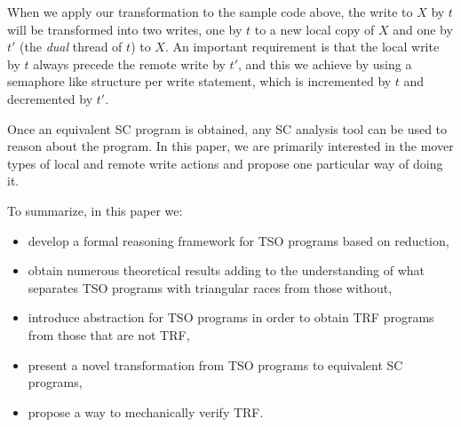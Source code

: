 \documentclass[preprint,9pt]{sigplanconf}
\begin{document}
When we apply our transformation to the sample code above, the write to $X$ by $t$ will be transformed into two writes, one by $t$ to a new local copy of $X$ and one by $t'$ (the {\em dual} thread of $t$) to $X$.
An important requirement is that the local write by $t$ always precede the remote write by $t'$, and this we achieve by using a semaphore like structure per write statement, which is incremented by $t$ and decremented by $t'$. 

Once an equivalent SC program is obtained, any SC analysis tool can be used to reason about the program.
In this paper, we are primarily interested in the mover types of local and remote write actions and propose one particular way of doing it.

To summarize, in this paper we:
\begin{itemize}
\item develop a formal reasoning framework for TSO programs based on reduction,
\item obtain numerous theoretical results adding to the understanding of what separates TSO programs with triangular races from those without,
\item introduce abstraction for TSO programs in order to obtain TRF programs from those that are not TRF,
\item present a novel transformation from TSO programs to equivalent SC programs,
\item propose a way to mechanically verify TRF.
\end{itemize}
\end{document}
